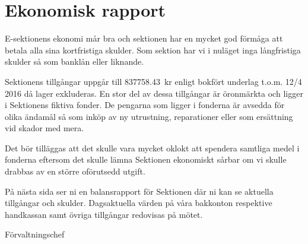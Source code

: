 \documentclass[../_main/handlingar.tex]{subfiles}
\begin{document}
\section{Ekonomisk rapport}

E-sektionens ekonomi mår bra och sektionen har en mycket god förmåga att betala alla sina kortfristiga skulder. Som sektion har vi i nuläget inga långfristiga skulder så som banklån eller liknande.

Sektionens tillgångar uppgår till \SI{837758.43}{kr} enligt bokfört underlag t.o.m. 12/4 2016 då lager exkluderas. En stor del av dessa tillgångar är öronmärkta och ligger i Sektionens fiktiva fonder. De pengarna som ligger i fonderna är avsedda för olika ändamål så som inköp av ny utrustning, reparationer eller som ersättning vid skador med mera.

Det bör tilläggas att det skulle vara mycket oklokt att spendera samtliga medel i fonderna  eftersom det skulle lämna Sektionen ekonomiskt sårbar om vi skulle drabbas av en större oförutsedd utgift.

På nästa sida ser ni en balansrapport för Sektionen där ni kan se aktuella tillgångar och skulder. Dagsaktuella värden på våra bakkonton respektive handkassan samt övriga tillgångar redovisas på mötet.

\begin{signatures}{1}
    \mvh
    \signature{Anders Nilsson}{Förvaltningschef}
\end{signatures}
\end{document}
